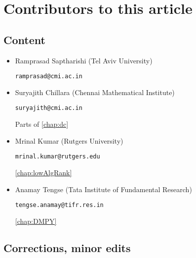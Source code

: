 \chapter*{Contributors to this article}

\section*{Content}

\begin{itemize}
\item Ramprasad Saptharishi (Tel Aviv University)

\texttt{ramprasad@cmi.ac.in}

\item Suryajith Chillara (Chennai Mathematical Institute)

\texttt{suryajith@cmi.ac.in}

Parts of \autoref{chap:dc}


\item Mrinal Kumar (Rutgers University)

\texttt{mrinal.kumar@rutgers.edu}

\autoref{chap:lowAlgRank}

\item Anamay Tengse (Tata Institute of Fundamental Research)

\texttt{tengse.anamay@tifr.res.in}

\autoref{chap:DMPY}

\end{itemize}

\section*{Corrections, minor edits}


